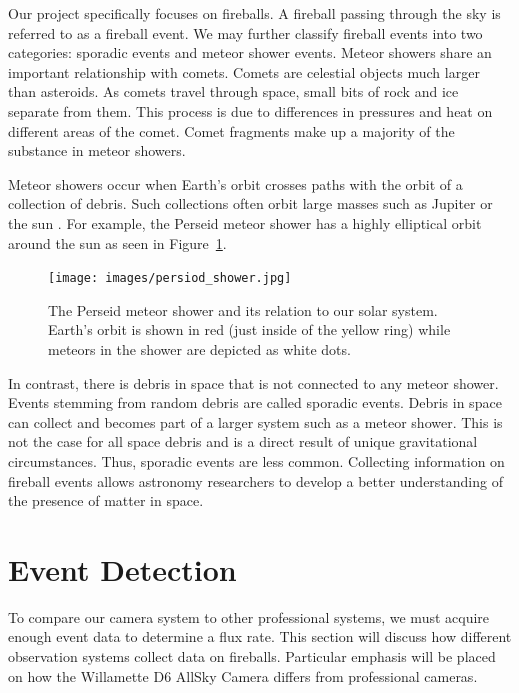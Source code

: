 Our project specifically focuses on fireballs.
A fireball passing through the sky is referred to as a fireball event.
We may further classify fireball events into two categories: sporadic events and meteor shower events.
Meteor showers share an important relationship with comets.
Comets are celestial objects much larger than asteroids.
As comets travel through space, small bits of rock and ice separate from them.
This process is due to differences in pressures and heat on different areas of the comet.
Comet fragments make up a majority of the substance in meteor showers.


Meteor showers occur when Earth's orbit crosses paths with the orbit of a collection of debris. 
Such collections often orbit large masses such as Jupiter or the sun \cite{trigo-rodriguez_2006_2007}.
For example, the Perseid meteor shower has a highly elliptical orbit around the sun as seen in Figure~\ref{perceid}.  

\begin{figure}[ht!]
  \centering
  \texttt{[image: images/persiod\_shower.jpg]}
  \caption[The Perseid meteor shower and its relation to our solar system.]{The Perseid meteor shower and its relation to our solar system.  Earth's orbit is shown in red (just inside of the yellow ring) while meteors in the shower are depicted as white dots.}
  \label{perceid}
\end{figure}

In contrast, there is debris in space that is not connected to any meteor shower. 
Events stemming from random debris are called sporadic events.
Debris in space can collect and becomes part of a larger system such as a meteor shower.
This is not the case for all space debris and is a direct result of unique gravitational circumstances.
Thus, sporadic events are less common.
Collecting information on fireball events allows astronomy researchers to develop a better understanding of the presence of matter in space. 

\section{Event Detection}

To compare our camera system to other professional systems, we must acquire enough event data to determine a flux rate.  
This section will discuss how different observation systems collect data on fireballs.
Particular emphasis will be placed on how the Willamette D6 AllSky Camera differs from professional cameras.


